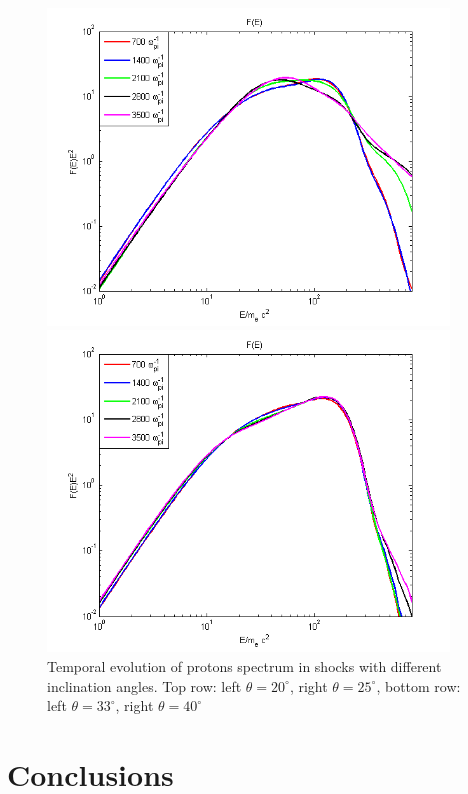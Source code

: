 \documentclass[a4paper]{jpconf}
\begin{document}
\begin{figure}[h!]
\begin{minipage}{0.49\textwidth}
		\includegraphics[width=0.95\textwidth]{fig/spectrump33.png} 
	\end{minipage}
	\begin{minipage}{0.49\textwidth}
		\centering
		\includegraphics[width=0.95\textwidth]{fig/spectrump40.png} 
	\end{minipage}
	\caption{Temporal evolution of protons spectrum in shocks with different inclination angles. Top row: left $\theta = 20^\circ$, right $\theta = 25^\circ$, bottom row: left $\theta = 33^\circ$, right $\theta = 40^\circ$}
	\label{spectrump}
\end{figure}
	

	
	\section{Conclusions}
	
\end{document}
